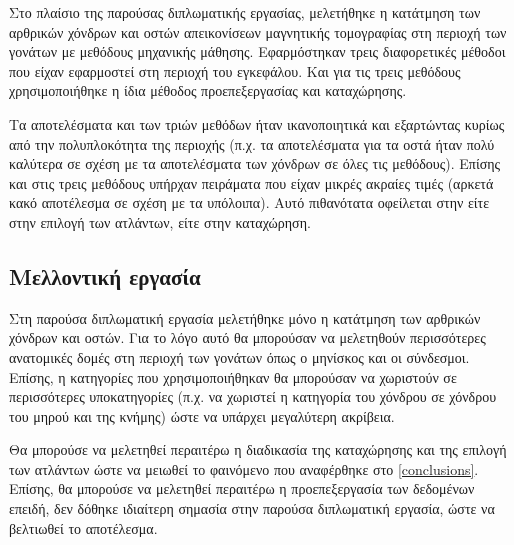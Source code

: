 \documentclass[a4paper,12pt]{article}
\begin{document}
Στο πλαίσιο της παρούσας διπλωματικής εργασίας, μελετήθηκε η κατάτμηση των
αρθρικών χόνδρων και οστών απεικονίσεων μαγνητικής τομογραφίας στη περιοχή των
γονάτων με μεθόδους μηχανικής μάθησης. Εφαρμόστηκαν τρεις διαφορετικές μέθοδοι
\cite{Zhang:1} \cite{Tong:1} \cite{Coupe:1} που είχαν εφαρμοστεί στη περιοχή του
εγκεφάλου. Και για τις τρεις μεθόδους χρησιμοποιήθηκε η ίδια μέθοδος
προεπεξεργασίας και καταχώρησης.

Τα αποτελέσματα και των τριών μεθόδων ήταν ικανοποιητικά και εξαρτώντας κυρίως
από την πολυπλοκότητα της περιοχής (π.χ. τα αποτελέσματα για τα οστά ήταν πολύ
καλύτερα σε σχέση με τα αποτελέσματα των χόνδρων σε όλες τις μεθόδους). Επίσης
και στις τρεις μεθόδους υπήρχαν πειράματα που είχαν μικρές ακραίες τιμές (αρκετά
κακό αποτέλεσμα σε σχέση με τα υπόλοιπα). Αυτό πιθανότατα οφείλεται στην είτε
στην επιλογή των ατλάντων, είτε στην καταχώρηση.

\subsection{Μελλοντική εργασία}

Στη παρούσα διπλωματική εργασία μελετήθηκε μόνο η κατάτμηση των αρθρικών χόνδρων
και οστών. Για το λόγο αυτό θα μπορούσαν να μελετηθούν περισσότερες ανατομικές
δομές στη περιοχή των γονάτων όπως ο μηνίσκος και οι σύνδεσμοι. Επίσης, η
κατηγορίες που χρησιμοποιήθηκαν θα μπορούσαν να χωριστούν σε περισσότερες
υποκατηγορίες (π.χ. να χωριστεί η κατηγορία του χόνδρου σε χόνδρου του μηρού και
της κνήμης) ώστε να υπάρχει μεγαλύτερη ακρίβεια.

Θα μπορούσε να μελετηθεί περαιτέρω η διαδικασία της καταχώρησης και της επιλογή
των ατλάντων ώστε να μειωθεί το φαινόμενο που αναφέρθηκε στο \ref{conclusions}.
Επίσης, θα μπορούσε να μελετηθεί περαιτέρω η προεπεξεργασία των δεδομένων
επειδή, δεν δόθηκε ιδιαίτερη σημασία στην παρούσα διπλωματική εργασία, ώστε να
βελτιωθεί το αποτέλεσμα.

\newpage

\printbibliography[title=Βιβλιογραφία]
\end{document}
